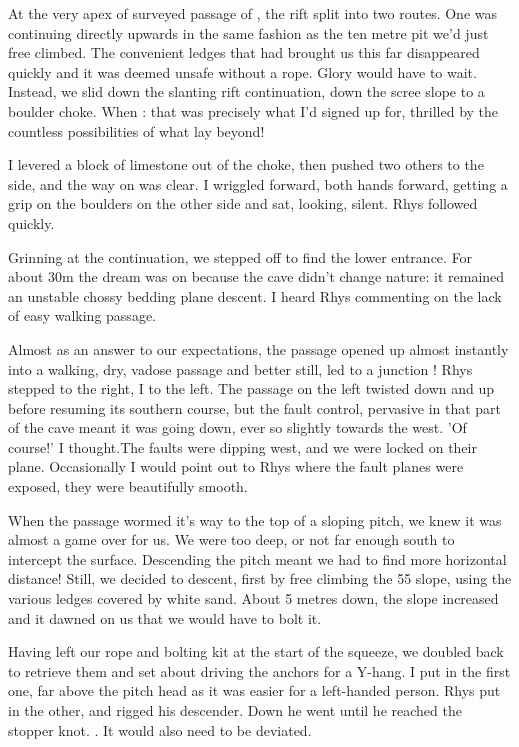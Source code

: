 At the very apex of surveyed passage of , the rift split into two routes. One was continuing directly upwards in the same fashion as the ten metre pit we'd just free climbed. The convenient ledges that had brought us this far disappeared quickly and it was deemed unsafe without a rope. Glory would have to wait. Instead, we slid down the slanting rift continuation, down the scree slope to a boulder choke. When : that was precisely what I'd signed up for, thrilled by the countless possibilities of what lay beyond!

I levered a block of limestone out of the choke, then pushed two others to the side, and the way on was clear. I wriggled forward, both hands forward, getting a grip on the boulders on the other side and sat, looking, silent. Rhys followed quickly.

Grinning at the continuation, we stepped off to find the lower entrance. For about 30m the dream was on because the cave didn't change nature: it remained an unstable chossy bedding plane descent. I heard Rhys commenting on the lack of easy walking passage.

Almost as an answer to our expectations,  the passage opened up almost instantly into a walking, dry, vadose passage and better still, led to a junction ! Rhys stepped to the right, I to the left. The passage on the left twisted down and up before resuming its southern course,  but the fault control, pervasive in that part of the cave meant it was going down, ever so slightly towards the west. 'Of course!' I thought.The faults were dipping west, and we were locked on their plane. Occasionally I would point out to Rhys where the fault planes were exposed, they were beautifully smooth.

When the passage wormed it's way to the top of a sloping pitch, we knew it was almost a game over for us. We were too deep, or not far enough south to intercept the surface. Descending the pitch meant we had to find more horizontal distance! Still, we decided to descent, first by free climbing the 55 slope, using the various ledges covered by white sand. About 5 metres down, the slope increased and it dawned on us that we would have to bolt it. 

Having left our rope and bolting kit at the start of the squeeze, we doubled back to retrieve them and set about driving the anchors for a Y-hang. I put in the first one, far above the pitch head as it was easier for a left-handed person. Rhys put in the other, and rigged his descender. Down he went until he reached the stopper knot. . It would also need to be deviated.
 
